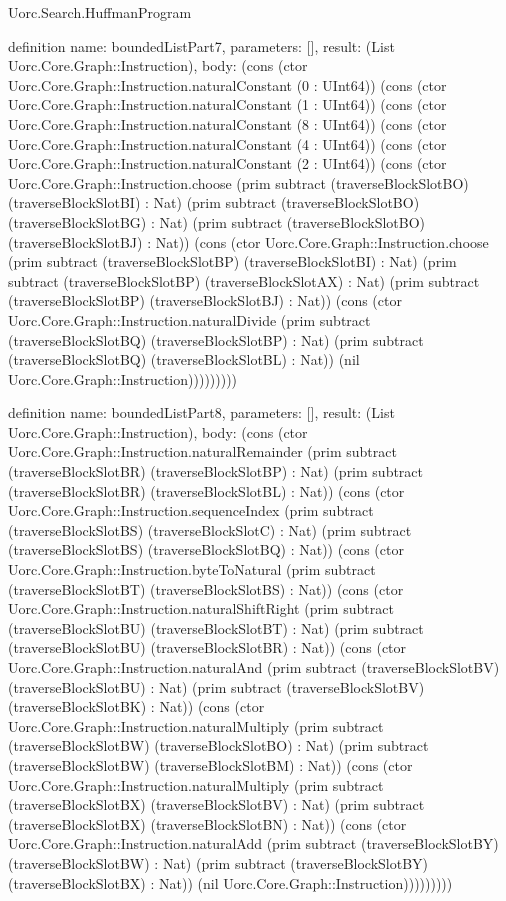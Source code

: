 \begin{lexlean}{Uorc.Search.HuffmanProgram}
\begin{semanticmodule}
definition{
  name: boundedListPart7,
  parameters: [],
  result: (List Uorc.Core.Graph::Instruction),
  body: (cons (ctor Uorc.Core.Graph::Instruction.naturalConstant (0 : UInt64)) (cons (ctor Uorc.Core.Graph::Instruction.naturalConstant (1 : UInt64)) (cons (ctor Uorc.Core.Graph::Instruction.naturalConstant (8 : UInt64)) (cons (ctor Uorc.Core.Graph::Instruction.naturalConstant (4 : UInt64)) (cons (ctor Uorc.Core.Graph::Instruction.naturalConstant (2 : UInt64)) (cons (ctor Uorc.Core.Graph::Instruction.choose (prim subtract (traverseBlockSlotBO) (traverseBlockSlotBI) : Nat) (prim subtract (traverseBlockSlotBO) (traverseBlockSlotBG) : Nat) (prim subtract (traverseBlockSlotBO) (traverseBlockSlotBJ) : Nat)) (cons (ctor Uorc.Core.Graph::Instruction.choose (prim subtract (traverseBlockSlotBP) (traverseBlockSlotBI) : Nat) (prim subtract (traverseBlockSlotBP) (traverseBlockSlotAX) : Nat) (prim subtract (traverseBlockSlotBP) (traverseBlockSlotBJ) : Nat)) (cons (ctor Uorc.Core.Graph::Instruction.naturalDivide (prim subtract (traverseBlockSlotBQ) (traverseBlockSlotBP) : Nat) (prim subtract (traverseBlockSlotBQ) (traverseBlockSlotBL) : Nat)) (nil Uorc.Core.Graph::Instruction)))))))))
}

definition{
  name: boundedListPart8,
  parameters: [],
  result: (List Uorc.Core.Graph::Instruction),
  body: (cons (ctor Uorc.Core.Graph::Instruction.naturalRemainder (prim subtract (traverseBlockSlotBR) (traverseBlockSlotBP) : Nat) (prim subtract (traverseBlockSlotBR) (traverseBlockSlotBL) : Nat)) (cons (ctor Uorc.Core.Graph::Instruction.sequenceIndex (prim subtract (traverseBlockSlotBS) (traverseBlockSlotC) : Nat) (prim subtract (traverseBlockSlotBS) (traverseBlockSlotBQ) : Nat)) (cons (ctor Uorc.Core.Graph::Instruction.byteToNatural (prim subtract (traverseBlockSlotBT) (traverseBlockSlotBS) : Nat)) (cons (ctor Uorc.Core.Graph::Instruction.naturalShiftRight (prim subtract (traverseBlockSlotBU) (traverseBlockSlotBT) : Nat) (prim subtract (traverseBlockSlotBU) (traverseBlockSlotBR) : Nat)) (cons (ctor Uorc.Core.Graph::Instruction.naturalAnd (prim subtract (traverseBlockSlotBV) (traverseBlockSlotBU) : Nat) (prim subtract (traverseBlockSlotBV) (traverseBlockSlotBK) : Nat)) (cons (ctor Uorc.Core.Graph::Instruction.naturalMultiply (prim subtract (traverseBlockSlotBW) (traverseBlockSlotBO) : Nat) (prim subtract (traverseBlockSlotBW) (traverseBlockSlotBM) : Nat)) (cons (ctor Uorc.Core.Graph::Instruction.naturalMultiply (prim subtract (traverseBlockSlotBX) (traverseBlockSlotBV) : Nat) (prim subtract (traverseBlockSlotBX) (traverseBlockSlotBN) : Nat)) (cons (ctor Uorc.Core.Graph::Instruction.naturalAdd (prim subtract (traverseBlockSlotBY) (traverseBlockSlotBW) : Nat) (prim subtract (traverseBlockSlotBY) (traverseBlockSlotBX) : Nat)) (nil Uorc.Core.Graph::Instruction)))))))))
}


\end{semanticmodule}
\end{lexlean}
